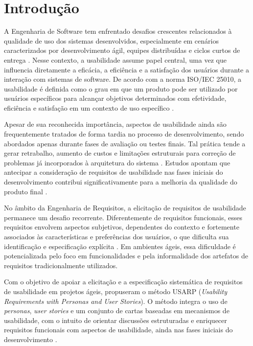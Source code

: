 \chapter{Introdução}

A Engenharia de Software tem enfrentado desafios crescentes relacionados à qualidade de uso dos sistemas desenvolvidos, especialmente em cenários caracterizados por desenvolvimento ágil, equipes distribuídas e ciclos curtos de entrega \cite{sommerville2011}. Nesse contexto, a usabilidade assume papel central, uma vez que influencia diretamente a eficácia, a eficiência e a satisfação dos usuários durante a interação com sistemas de software. De acordo com a norma ISO/IEC 25010, a usabilidade é definida como o grau em que um produto pode ser utilizado por usuários específicos para alcançar objetivos determinados com efetividade, eficiência e satisfação em um contexto de uso específico \cite{iso25010}.

Apesar de sua reconhecida importância, aspectos de usabilidade ainda são frequentemente tratados de forma tardia no processo de desenvolvimento, sendo abordados apenas durante fases de avaliação ou testes finais. Tal prática tende a gerar retrabalho, aumento de custos e limitações estruturais para correção de problemas já incorporados à arquitetura do sistema \cite{juristo2007}. Estudos apontam que antecipar a consideração de requisitos de usabilidade nas fases iniciais do desenvolvimento contribui significativamente para a melhoria da qualidade do produto final \cite{carvajal2013}.

No âmbito da Engenharia de Requisitos, a elicitação de requisitos de usabilidade permanece um desafio recorrente. Diferentemente de requisitos funcionais, esses requisitos envolvem aspectos subjetivos, dependentes do contexto e fortemente associados às características e preferências dos usuários, o que dificulta sua identificação e especificação explícita \cite{ardito2014}. Em ambientes ágeis, essa dificuldade é potencializada pelo foco em funcionalidades e pela informalidade dos artefatos de requisitos tradicionalmente utilizados.

Com o objetivo de apoiar a elicitação e a especificação sistemática de requisitos de usabilidade em projetos ágeis,  propuseram o método USARP (\textit{Usability Requirements with Personas and User Stories}). O método integra o uso de \textit{personas}, \textit{user stories} e um conjunto de cartas baseadas em mecanismos de usabilidade, com o intuito de orientar discussões estruturadas e enriquecer requisitos funcionais com aspectos de usabilidade, ainda nas fases iniciais do desenvolvimento \cite{oliveirajr2020}.

